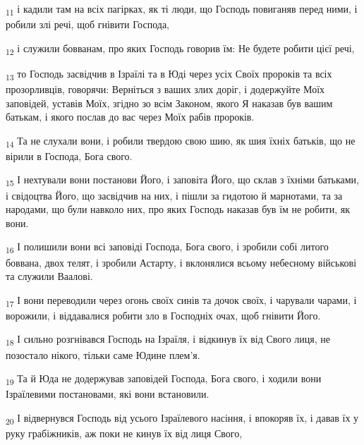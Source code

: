 \begin{tcolorbox}
\textsubscript{11} і кадили там на всіх пагірках, як ті люди, що Господь повиганяв перед ними, і робили злі речі, щоб гнівити Господа,
\end{tcolorbox}
\begin{tcolorbox}
\textsubscript{12} і служили бовванам, про яких Господь говорив їм: Не будете робити цієї речі,
\end{tcolorbox}
\begin{tcolorbox}
\textsubscript{13} то Господь засвідчив в Ізраїлі та в Юді через усіх Своїх пророків та всіх прозорливців, говорячи: Верніться з ваших злих доріг, і додержуйте Моїх заповідей, уставів Моїх, згідно зо всім Законом, якого Я наказав був вашим батькам, і якого послав до вас через Моїх рабів пророків.
\end{tcolorbox}
\begin{tcolorbox}
\textsubscript{14} Та не слухали вони, і робили твердою свою шию, як шия їхніх батьків, що не вірили в Господа, Бога свого.
\end{tcolorbox}
\begin{tcolorbox}
\textsubscript{15} І нехтували вони постанови Його, і заповіта Його, що склав з їхніми батьками, і свідоцтва Його, що засвідчив на них, і пішли за гидотою й марнотами, та за народами, що були навколо них, про яких Господь наказав був їм не робити, як вони.
\end{tcolorbox}
\begin{tcolorbox}
\textsubscript{16} І полишили вони всі заповіді Господа, Бога свого, і зробили собі литого боввана, двох телят, і зробили Астарту, і вклонялися всьому небесному військові та служили Ваалові.
\end{tcolorbox}
\begin{tcolorbox}
\textsubscript{17} І вони переводили через огонь своїх синів та дочок своїх, і чарували чарами, і ворожили, і віддавалися робити зло в Господніх очах, щоб гнівити Його.
\end{tcolorbox}
\begin{tcolorbox}
\textsubscript{18} І сильно розгнівався Господь на Ізраїля, і відкинув їх від Свого лиця, не позостало нікого, тільки саме Юдине плем'я.
\end{tcolorbox}
\begin{tcolorbox}
\textsubscript{19} Та й Юда не додержував заповідей Господа, Бога свого, і ходили вони Ізраїлевими постановами, які вони встановили.
\end{tcolorbox}
\begin{tcolorbox}
\textsubscript{20} І відвернувся Господь від усього Ізраїлевого насіння, і впокоряв їх, і давав їх у руку грабіжників, аж поки не кинув їх від лиця Свого,
\end{tcolorbox}
